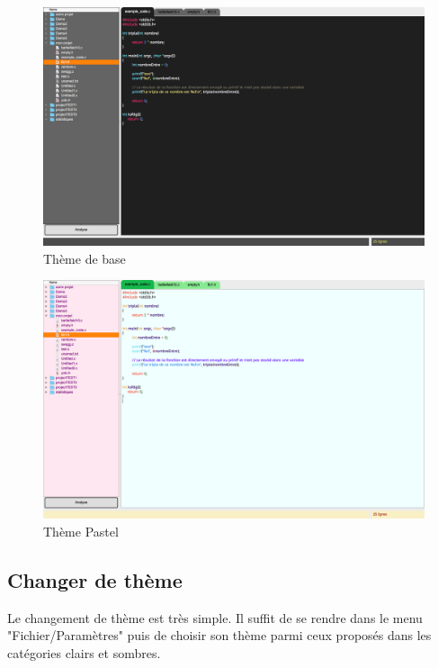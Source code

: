 \documentclass[a4paper,12pt]{article}
\begin{document}
		\begin{figure}[h!]
			\begin{center}
				\includegraphics[scale=0.23]{images/imgs_themes/theme_basic}
				\caption{Thème de base}
			\end{center}
		\end{figure}
		
		\begin{figure}[h!]
			\begin{center}
				\includegraphics[scale=0.23]{images/imgs_themes/theme_pastel}
				\caption{Thème Pastel}
			\end{center}
		\end{figure}
		
		\newpage
		\subsection{Changer de thème}
		
			Le changement de thème est très simple. Il suffit de se rendre dans le menu "Fichier/Paramètres" puis de choisir son thème parmi ceux proposés dans les catégories clairs et sombres.
	
\end{document}
